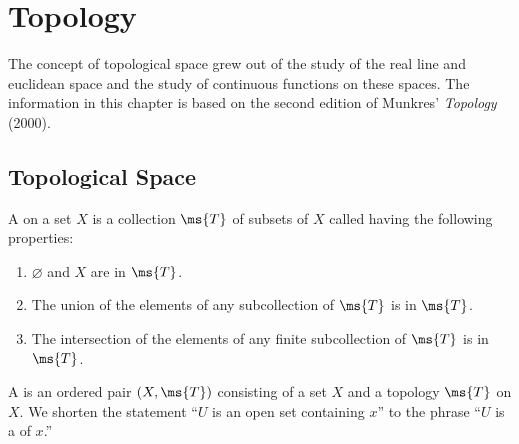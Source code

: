 \chapter{Topology}

The concept of topological space grew out of the study of the 
real line and euclidean space and the study of continuous 
functions on these spaces. The information in this chapter is 
based on the second edition of Munkres' \emph{Topology} (2000).

\newpage


\section{Topological Space}\label{top space}

\begin{definition}
	A  on a set $X$ is a collection 
	$\ms{T}$ of subsets of $X$ called  having the following properties:
	\begin{enumerate}
		\item $\varnothing$ and $X$ are in $\ms{T}$.
		
		\item The union of the elements of any subcollection of 
		$\ms{T}$ is in $\ms{T}$.
		
		\item The intersection of the elements of any finite 
		subcollection of $\ms{T}$ is in $\ms{T}$.
	\end{enumerate}
	
	A  is 
	an 
	ordered pair $(X,\ms{T})$ consisting of a set $X$ and a 
	topology $\ms{T}$ on $X$. We shorten the statement ``$U$ is 
	an open set containing $x$'' to the phrase ``$U$ is a 
	 of $x$.''
\end{definition}

